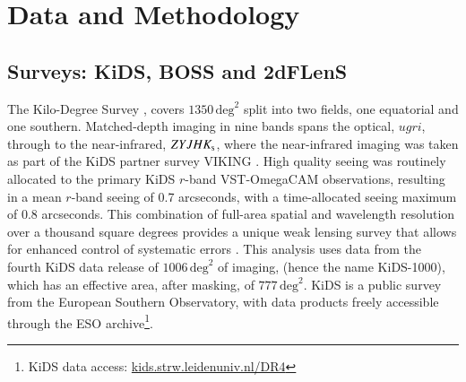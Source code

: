 \section{Data and Methodology}
\label{sec:data}

\subsection{Surveys:  KiDS, BOSS and 2dFLenS}
\label{sec:surveys}

The Kilo-Degree Survey \citep[KiDS,][]{dejong/etal:2013}, covers $1350\,\mathrm{deg}^{2}$ split into two fields, one
equatorial and one southern.    Matched-depth imaging in nine bands spans the optical,
$ugri$, through to the near-infrared, $ZYJHK_{\rm s}$, where the
near-infrared imaging was taken as part of the KiDS partner survey
VIKING \citep[the VISTA Kilo-degree INfrared Galaxy
survey,][]{edge/etal:2013}.  High quality seeing was
routinely allocated to the primary KiDS $r$-band VST-OmegaCAM observations, resulting in a
mean $r$-band seeing of 0.7 arcseconds, with a time-allocated seeing maximum of 0.8
arcseconds.  This combination of full-area spatial and wavelength
resolution over a thousand square degrees
provides a unique weak lensing survey that allows for enhanced
control of systematic errors \citep{giblin/etal:inprep, hildebrandt/etal:inprep}.
This analysis uses data from the fourth KiDS
data release of $1006\,\mathrm{deg}^{2}$ of imaging, (hence the name KiDS-1000), which has an effective
area, after masking, of $777\,\mathrm{deg}^{2}$.  KiDS is a public survey from the European Southern
Observatory, with data products freely accessible through the ESO
archive\footnote{KiDS data access: \href{http://kids.strw.leidenuniv.nl/DR4}{kids.strw.leidenuniv.nl/DR4}}.   

